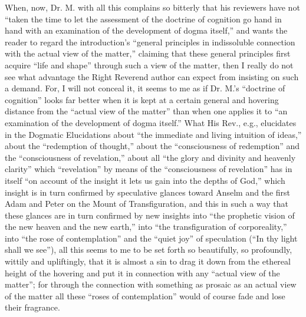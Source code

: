 \documentclass[12pt,a4paper,openany]{book}
\newcommand{\opage}[1]{\marginnote{\footnotesize\textit{[#1]}}}
\begin{document}
When, now, Dr. M. with all this complains so bitterly that his reviewers have not ``taken the time to let
\setcounter{footnote}{0}%
\opage{42}the assessment of the doctrine of cognition go hand in hand with
an examination of the development of dogma itself,'' and wants
the reader to regard the introduction's ``general principles in
indissoluble connection with the actual view of the matter,''
claiming that these general principles first acquire ``life and
shape'' through such a view of the matter, then I really do not
see what advantage the Right Reverend author can expect from
insisting on such a demand. For, I will not conceal it, it seems
to me as if Dr. M.'s ``doctrine of cognition'' looks far better
when it is kept at a certain general and hovering distance from
the ``actual view of the matter'' than when one applies it to
``an examination of the development of dogma itself.'' What His Rev.,
e.g., elucidates in the Dogmatic Elucidations about ``the immediate
and living intuition of ideas,'' about the ``redemption of thought,''
about the ``consciousness of redemption'' and the ``consciousness
of revelation,'' about all ``the glory and divinity and heavenly
clarity'' which ``revelation'' by means of the ``consciousness of
revelation'' has in itself ``on account of the insight it lets
us gain into the depths of God,'' which insight is in turn
confirmed by speculative glances toward Anselm and the first Adam
and Peter on the Mount of Transfiguration, and this in such a way
that these glances are in turn confirmed by new insights into
``the prophetic vision of the new heaven and the new earth,'' into
``the transfiguration of corporeality,'' into ``the rose of
contemplation'' and the ``quiet joy'' of speculation (``In thy light
shall we see''), all this seems to me to be set forth so beautifully,
so profoundly, wittily and upliftingly, that it is almost a sin
to drag it down from the ethereal height of the hovering and put
it in connection with any ``actual
\setcounter{footnote}{0}%
\opage{43}view of the matter''; for through the connection with something
as prosaic as an actual view of the matter all these ``roses of
contemplation'' would of course fade and lose their fragrance.
\end{document}

